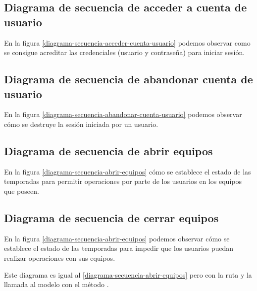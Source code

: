 \subsection{Diagrama de secuencia de acceder a cuenta de usuario}

En la figura \ref{diagrama-secuencia-acceder-cuenta-usuario} podemos observar
como se consigue acreditar las credenciales (usuario y contraseña) para iniciar
sesión.


\subsection{Diagrama de secuencia de abandonar cuenta de usuario}

En la figura \ref{diagrama-secuencia-abandonar-cuenta-usuario} podemos observar
cómo se destruye la sesión iniciada por un usuario.


\subsection{Diagrama de secuencia de abrir equipos}

En la figura \ref{diagrama-secuencia-abrir-equipos} cómo se establece el estado
de las temporadas para permitir operaciones por parte de los usuarios en los
equipos que poseen.


\subsection{Diagrama de secuencia de cerrar equipos}
En la figura \ref{diagrama-secuencia-abrir-equipos} podemos observar cómo se
establece el estado de las temporadas para impedir que los usuarios puedan
realizar operaciones con sus equipos.

Este diagrama es igual al \ref{diagrama-secuencia-abrir-equipos} pero con la
ruta  y la llamada al modelo con el método
.


